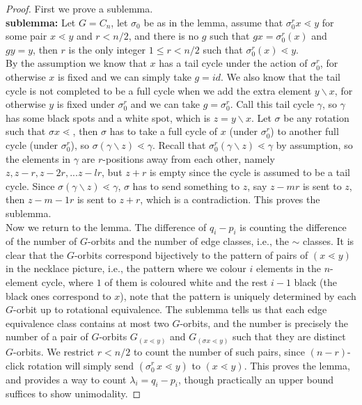 \documentclass[12pt]{article}
\newcommand{\1}{\mathbb{I}}
\newcommand{\minus}{\backslash}
\theoremstyle{definition}
\theoremstyle{definition}
\theoremstyle{definition}
\theoremstyle{definition}
\theoremstyle{definition}
\theoremstyle{definition}
\begin{document}
\begin{proof}

First we prove a sublemma.  \\

\textbf{sublemma:} Let $G = C_n$, let $\sigma_0$ be as in the lemma, assume that $\sigma_0^r x \lessdot y$ for some pair $x \lessdot y$ and $r < n/2$, and there is no $g$ such that $g x = \sigma_0^r (x)$ and $gy = y$, then $r$ is the only integer $1 \le r < n/2$ such that $\sigma_0^r (x) \lessdot y$.  \\

By the assumption we know that $x$ has a tail cycle under the action of $\sigma_0^{r}$, for otherwise $x$ is fixed and we can simply take $g = id$. We also know that the tail cycle is not completed to be a full cycle when we add the extra element $y \minus x$, for otherwise $y$ is fixed under $\sigma_0^r$  and we can take $g = \sigma_0^r$.  Call this tail cycle $\gamma$, so $\gamma$ has some black spots and a white spot, which is $z = y \minus x$. Let $\sigma$ be any rotation such that $\sigma x \lessdot$, then $\sigma$ has to take a full cycle of $x$ (under $\sigma_0^r$) to another full cycle (under $\sigma_0^r$), so $\sigma (\gamma \minus z) \lessdot \gamma$. Recall that $\sigma_0^r (\gamma \minus z) \lessdot \gamma$ by assumption, so the elements in $\gamma$ are $r$-positions away from each other, namely $z, z-r, z-2r, ... z -l r$, but $z+r$ is empty since the cycle is assumed to be a tail cycle. Since $\sigma (\gamma \minus z) \lessdot \gamma$, $\sigma$ has to send something to $z$, say $z - m r$ is sent to $z$, then $z - {m-1}r$ is sent to $z+r$, which is a contradiction. This proves the sublemma. \\

Now we return to the lemma. The difference of $q_i - p_i$ is counting the difference of the number of $G$-orbits and the number of edge classes, i.e.,  the $\sim$ classes. It is clear that the $G$-orbits correspond bijectively to the pattern of pairs of $(x \lessdot y)$ in the necklace picture, i.e., the pattern where we colour $i$ elements in the  $n$-element cycle, where $1$ of them is coloured white and the rest $i-1$ black (the black ones correspond to $x$), note that the pattern is uniquely determined by each $G$-orbit up to rotational equivalence. The sublemma tells us that each edge equivalence class contains at most two $G$-orbits, and the number is precisely the number of a pair of $G$-orbits $G_{(x \lessdot y)}$ and $G_{(\sigma x \lessdot y )}$ such that they are distinct $G$-orbits. We restrict $r < n/2$  to count the number of such pairs, since $(n -r)$-click rotation will simply send $(\sigma_0^r \, x \lessdot y)$ to $(x \lessdot y)$. This proves the lemma, and provides a way to count $\lambda_i = q_i - p_i$, though practically an upper bound suffices to show unimodality. 
\end{proof}
\end{document}
